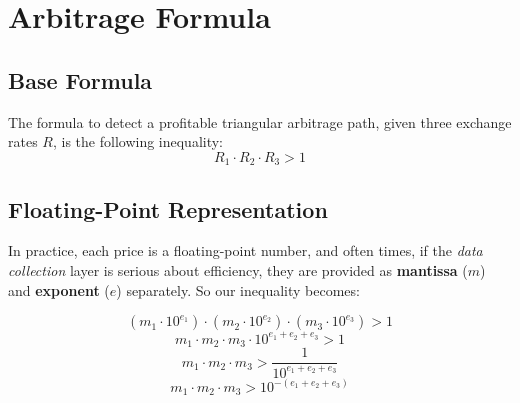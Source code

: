 \documentclass[11pt]{article}
\begin{document}
\begin{center}
\end{center}

\section{Arbitrage Formula}

\subsection{Base Formula}
The formula to detect a profitable triangular arbitrage path, given three exchange rates $R$, is the following inequality:
\begin{equation}
    R_{1} \cdot R_{2} \cdot R_{3} > 1
\end{equation}

\subsection{Floating-Point Representation}
In practice, each price is a floating-point number, and often times, if the \textit{data collection} layer is serious about efficiency, they are provided as \textbf{mantissa} ($m$) and \textbf{exponent} ($e$) separately. So our inequality becomes:

\begin{equation}
    \left( m_1 \cdot 10^{e_1} \right) \cdot \left( m_2 \cdot 10^{e_2} \right) \cdot \left( m_3 \cdot 10^{e_3} \right) > 1
\end{equation}
\begin{equation}
    m_1 \cdot m_2 \cdot m_3 \cdot 10^{e_1 + e_2 + e_3} > 1
\end{equation}
\begin{equation}
    m_1 \cdot m_2 \cdot m_3 > \frac{1}{10^{e_1 + e_2 + e_3}}
\end{equation}
\begin{equation}
    m_1 \cdot m_2 \cdot m_3 > 10^{-(e_1 + e_2 + e_3)}
\end{equation}
\end{document}
